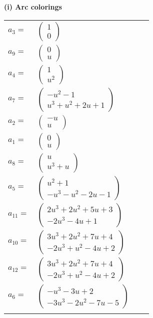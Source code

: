 \documentclass[1p]{elsarticle_modified}
\theoremstyle{definition}
\begin{document}
\flushleft \textbf{(i) Arc colorings}\\
\begin{tabular}{m{7pt} m{180pt} m{7pt} m{180pt} }
\flushright $a_{3}=$&$\begin{pmatrix}1\\0\end{pmatrix}$ \\
\flushright $a_{9}=$&$\begin{pmatrix}0\\u\end{pmatrix}$ \\
\flushright $a_{4}=$&$\begin{pmatrix}1\\u^2\end{pmatrix}$ \\
\flushright $a_{7}=$&$\begin{pmatrix}- u^2-1\\u^3+u^2+2 u+1\end{pmatrix}$ \\
\flushright $a_{2}=$&$\begin{pmatrix}- u\\u\end{pmatrix}$ \\
\flushright $a_{1}=$&$\begin{pmatrix}0\\u\end{pmatrix}$ \\
\flushright $a_{8}=$&$\begin{pmatrix}u\\u^3+u\end{pmatrix}$ \\
\flushright $a_{5}=$&$\begin{pmatrix}u^2+1\\- u^3- u^2-2 u-1\end{pmatrix}$ \\
\flushright $a_{11}=$&$\begin{pmatrix}2 u^3+2 u^2+5 u+3\\-2 u^3-4 u+1\end{pmatrix}$ \\
\flushright $a_{10}=$&$\begin{pmatrix}3 u^3+2 u^2+7 u+4\\-2 u^3+u^2-4 u+2\end{pmatrix}$ \\
\flushright $a_{12}=$&$\begin{pmatrix}3 u^3+2 u^2+7 u+4\\-2 u^3+u^2-4 u+2\end{pmatrix}$ \\
\flushright $a_{6}=$&$\begin{pmatrix}- u^3-3 u+2\\-3 u^3-2 u^2-7 u-5\end{pmatrix}$\\&\end{tabular}
\end{document}
